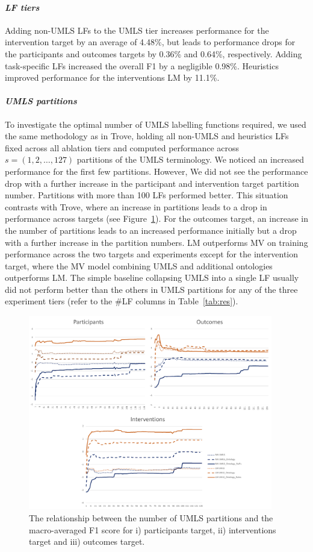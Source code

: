 \documentclass[10.7pt,]{article}
\let\oldparagraph\paragraph
\renewcommand{\paragraph}[1]{\oldparagraph{#1}\mbox{}}
\begin{document}
\paragraph{\textit{LF tiers}}
Adding non-UMLS LFs to the UMLS tier increases performance for the intervention target by an average of 4.48\%, but leads to performance drops for the participants and outcomes targets by 0.36\% and 0.64\%, respectively.
Adding task-specific LFs increased the overall F1 by a negligible 0.98\%.
Heuristics improved performance for the interventions LM by 11.1\%.
%
\paragraph{\textit{UMLS partitions}}
To investigate the optimal number of UMLS labelling functions required, we used the same methodology as in Trove, holding all non-UMLS and heuristics LFs fixed across all ablation tiers and computed performance across $s = ( 1, 2, \dotso , 127 )$ partitions of the UMLS terminology.
We noticed an increased performance for the first few partitions. However, We did not see the performance drop with a further increase in the participant and intervention target partition number.
Partitions with more than 100 LFs performed better.
This situation contrasts with Trove, where an increase in partitions leads to a drop in performance across targets (see Figure~\ref{fig:partitions}).
For the outcomes target, an increase in the number of partitions leads to an increased performance initially but a drop with a further increase in the partition numbers.
LM outperforms MV on training performance across the two targets and experiments except for the intervention target, where the MV model combining UMLS and additional ontologies outperforms LM.
The simple baseline collapsing UMLS into a single LF usually did not perform better than the others in UMLS partitions for any of the three experiment tiers (refer to the \#LF columns in Table~\ref{tab:res}).
%
\begin{figure}[!h]
    \centering
    \includegraphics[width=0.95\textwidth]{figures/partitions.pdf}
    \caption{The relationship between the number of UMLS partitions and the macro-averaged F1 score for i) participants target, ii) interventions target and iii) outcomes target.}
    \label{fig:partitions}
\end{figure}
%
%
%
\end{document}
